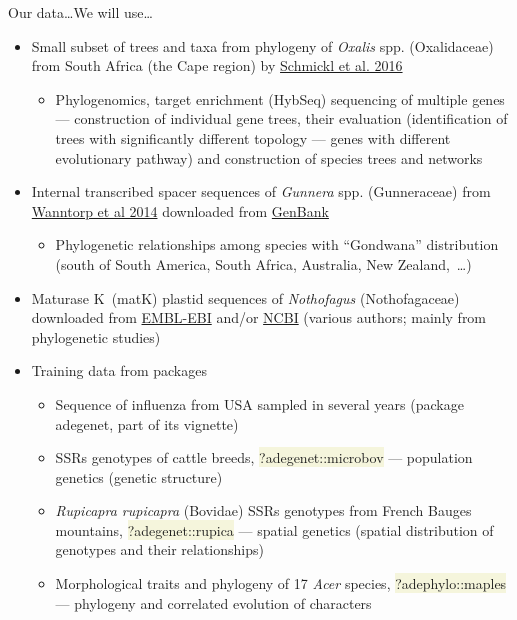 \documentclass[compress, xelatex, 11pt, xcolor=svgnames, aspectratio=169,
	hyperref={
		bookmarks=true,
		unicode=true,
		colorlinks=true,
		pdftitle={Molecular data in R},
		plainpages=false,
		pdfauthor={Vojtech Zeisek},
		pdfsubject={Course about phylogeny and evolution in R},
		pdfcreator={XeLaTeX},
		pdfkeywords={R, evolution, phylogeny, molecular data},
		linkcolor=Crimson, %
		anchorcolor=Magenta, %
		citecolor=Magenta, %
		filecolor=Magenta, %
		menucolor=Magenta, %
		urlcolor=DodgerBlue, %
		},
	url={hyphens, lowtilde} %
	]{beamer}
\renewcommand{\texttt}[1]{\colorbox{Beige}{{\ttfamily #1}}}
\begin{document}
\begin{frame}[allowframebreaks]{Our data\ldots}{We will use\ldots}
\begin{itemize}
\begin{itemize}
			\end{itemize}
			\item Small subset of trees and taxa from phylogeny of \textit{Oxalis} spp. (Oxalidaceae) from South Africa (the Cape region) by \href{https://onlinelibrary.wiley.com/doi/full/10.1111/1755-0998.12487}{Schmickl et al. 2016}
			\begin{itemize}
				\item Phylogenomics, target enrichment (HybSeq) sequencing of multiple genes --- construction of individual gene trees, their evaluation (identification of trees with significantly different topology --- genes with different evolutionary pathway) and construction of species trees and networks
			\end{itemize}
			\item Internal transcribed spacer sequences of \textit{Gunnera} spp. (Gunneraceae) from \href{https://bioone.org/journals/systematic-botany/volume-27/issue-3/0363-6445-27.3.512/Phylogenetic-Relationships-of-Gunnera-based-on-Nuclear-Ribosomal-DNA-ITS/10.1043/0363-6445-27.3.512.full}{Wanntorp et al 2014} downloaded from \href{https://www.ncbi.nlm.nih.gov/popset/22854787}{GenBank}
			\begin{itemize}
				\item Phylogenetic relationships among species with \enquote{Gondwana} distribution (south of South America, South Africa, Australia, New Zealand,~\ldots)
			\end{itemize}
			\item Maturase K~(matK) plastid sequences of \textit{Nothofagus} (Nothofagaceae) downloaded from \href{https://www.ebi.ac.uk/}{EMBL-EBI} and/or \href{https://www.ncbi.nlm.nih.gov/}{NCBI} (various authors; mainly from phylogenetic studies)
			\item Training data from packages
			\begin{itemize}
				\item Sequence of influenza from USA sampled in several years (package adegenet, part of its vignette)
				\item SSRs genotypes of cattle breeds, \texttt{?adegenet::microbov} --- population genetics (genetic structure)
				\item \textit{Rupicapra rupicapra} (Bovidae) SSRs genotypes from French Bauges mountains, \texttt{?adegenet::rupica} --- spatial genetics (spatial distribution of genotypes and their relationships)
				\item Morphological traits and phylogeny of 17 \textit{Acer} species, \texttt{?adephylo::maples} --- phylogeny and correlated evolution of characters

\end{itemize}
\end{itemize}
\end{frame}
\end{document}
